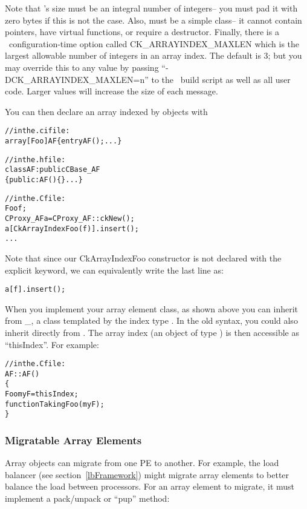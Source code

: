 Note that 's size must be an integral number of integers--
you must pad it with zero bytes if this is not the case.
Also,  must be a simple class-- it cannot contain 
pointers, have virtual functions, or require a destructor.
Finally, there is a \charmpp\ configuration-time option called
CK\_ARRAYINDEX\_MAXLEN  
which is the largest allowable number of 
integers in an array index.  The default is 3; but you may 
override this to any value by passing ``-DCK\_ARRAYINDEX\_MAXLEN=n'' 
to the \charmpp\ build script as well as all user code. Larger 
values will increase the size of each message.

You can then declare an array indexed by  objects with

\begin{alltt}
//in the .ci file:
array [Foo] AF \{ entry AF(); ... \}

//in the .h file:
class AF : public CBase\_AF
\{ public: AF() \{\} ... \}

//in the .C file:
    Foo f;
    CProxy_AF a=CProxy_AF::ckNew();
    a[CkArrayIndexFoo(f)].insert();
    ...
\end{alltt}

Note that since our CkArrayIndexFoo constructor is not declared
with the explicit keyword, we can equivalently write the last line as:

\begin{alltt}
    a[f].insert();
\end{alltt}

When you implement your array element class, as shown above you 
can inherit from \_, 
a class templated by the index type . In the old syntax,
you could also inherit directly from .
The array index (an object of type ) is then accessible as 
``thisIndex''. For example:

\begin{alltt}

//in the .C file:
AF::AF()
\{
    Foo myF=thisIndex;
    functionTakingFoo(myF);
\}
\end{alltt}


\subsubsection{Migratable Array Elements}
\label{arraymigratable}
Array objects can migrate from one PE to another.
For example, the load balancer (see section~\ref{lbFramework})
might migrate array elements to better balance the load between
processors.  For an array element to migrate, it must implement
a pack/unpack or ``pup'' method:

